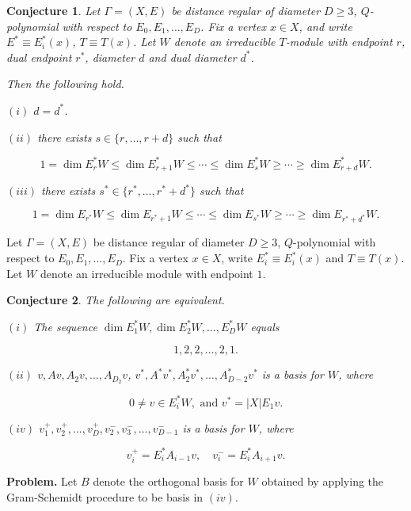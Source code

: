 \documentclass[
]{book}
\newtheorem{conjecture}{Conjecture}[chapter]
\theoremstyle{definition}
\theoremstyle{definition}
\theoremstyle{definition}
\theoremstyle{definition}
\theoremstyle{remark}
\begin{document}
\begin{conjecture}
\protect\hypertarget{cnj:unimodality}{}\label{cnj:unimodality}Let \(\Gamma = (X, E)\) be distance regular of diameter \(D\geq 3\), \(Q\)-polynomial with respect to \(E_0, E_1, \ldots, E_D\).
Fix a vertex \(x\in X\), and write \(E^*\equiv E^*_i(x)\), \(T\equiv T(x)\). Let \(W\) denote an irreducible \(T\)-module with endpoint \(r\), dual endpoint \(r^*\), diameter \(d\) and dual diameter \(d^*\).

Then the following hold.

\((i)\) \(d = d^*\).

\((ii)\) there exists \(s \in \{r, \ldots, r+d\}\) such that

\[1 = \dim E^*_rW \leq \dim E^*_{r+1}W \leq \cdots \leq \dim E^*_sW \geq \cdots \geq \dim E^*_{r+d}W.\]

\((iii)\) there exists \(s^* \in \{r^*, \ldots, r^*+d^*\}\) such that

\[1 = \dim E_{r^*}W \leq \dim E_{r^*+1}W \leq \cdots \leq \dim E_{s^*}W \geq \cdots \geq \dim E_{r^*+d^*}W.\]
\end{conjecture}

Let \(\Gamma = (X, E)\) be distance regular of diameter \(D\geq 3\), \(Q\)-polynomial with respect to \(E_0, E_1, \ldots, E_D\). Fix a vertex \(x\in X\), write \(E^*_i\equiv E^*_i(x)\) and \(T \equiv T(x)\). Let \(W\) denote an irreducible module with endpoint \(1\).

\begin{conjecture}
\protect\hypertarget{cnj:not-thin}{}\label{cnj:not-thin}The following are equivalent.

\((i)\) The sequence \(\dim E^*_1W, \dim E^*_2W, \ldots, E^*_DW\) equals

\[1, 2, 2, \ldots, 2, 1.\]

\((ii)\) \(v, Av, A_2v, \ldots, A_{D_2}v\), \(v^*, A^*v^*, A^*_2v^*, \ldots, A^*_{D-2}v^*\) is a basis for \(W\), where

\[0\neq v\in E^*_iW, \text{ and } v^* = |X|E_1v.\]

\((iv)\) \(v^+_1, v^+_2, \ldots, v^+_D, v^-_2, v^-_3, \ldots, v^-_{D-1}\) is a basis for \(W\), where

\[v^+_i = E^*_iA_{i-1}v, \quad v^-_i = E^*_iA_{i+1}v.\]
\end{conjecture}

\textbf{Problem.}
Let \(B\) denote the orthogonal basis for \(W\) obtained by applying the Gram-Schemidt procedure to be basis in \((iv)\).
\end{document}

